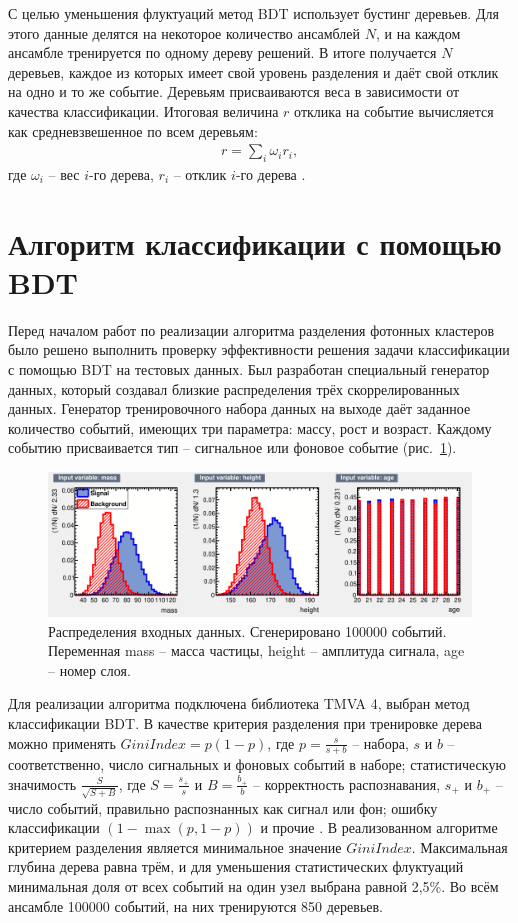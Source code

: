 \documentclass[14pt]{extarticle}
\begin{document}
С целью уменьшения флуктуаций метод BDT использует бустинг деревьев. Для этого данные делятся на некоторое количество ансамблей $N$, и на каждом ансамбле тренируется по одному дереву решений. В итоге получается $N$ деревьев, каждое из которых имеет свой уровень разделения и даёт свой отклик на одно и то же событие. Деревьям присваиваются веса в зависимости от качества классификации. Итоговая величина $r$ отклика на событие вычисляется как средневзвешенное по всем деревьям:
\begin{align*}
r = \sum_i \omega_i r_i,
\end{align*}
где $\omega_i$ -- вес $i$-го дерева, $r_i$ -- отклик $i$-го дерева \cite{tmva4}.

\section{Алгоритм классификации с помощью BDT}
Перед началом работ по реализации алгоритма разделения фотонных кластеров было решено выполнить
проверку эффективности решения задачи классификации с помощью BDT на тестовых данных.
Был разработан специальный генератор данных, который создавал близкие распределения трёх
скоррелированных данных.
Генератор тренировочного набора данных на выходе даёт заданное количество событий, имеющих три параметра: массу, рост и возраст. Каждому событию присваивается тип -- сигнальное или фоновое событие (рис.~\ref{fig:gendistr}).

\begin{figure}[h!]
	\centering
	\includegraphics[width=\linewidth]{../pics/inputdistr.png}
	\caption{Распределения входных данных. Сгенерировано 100000 событий. Переменная mass -- масса частицы, height -- амплитуда сигнала, age -- номер слоя.}
	\label{fig:gendistr}
\end{figure}

Для реализации алгоритма подключена библиотека TMVA 4, выбран метод классификации BDT. В качестве критерия разделения при тренировке дерева можно применять $GiniIndex = p(1-p)$, где $p = \frac{s}{s+b}$ --  набора, $s$ и $b$ -- соответственно, число сигнальных и фоновых событий в наборе; статистическую значимость $\frac{S}{\sqrt{S+B}}$, где $S=\frac{s_+}{s}$ и $B=\frac{b_+}{b}$ -- корректность распознавания, $s_+$ и $b_+$ -- число событий, правильно распознанных как сигнал или фон; ошибку классификации $(1-\max (p,{1-p}))$ и прочие \cite{tmva4}. В реализованном алгоритме критерием разделения является минимальное значение $GiniIndex$. Максимальная глубина дерева равна трём, и для уменьшения статистических флуктуаций минимальная доля от всех событий на один узел выбрана равной 2,5\%. Во всём ансамбле 100000 событий, на них тренируются 850 деревьев.
\end{document}
